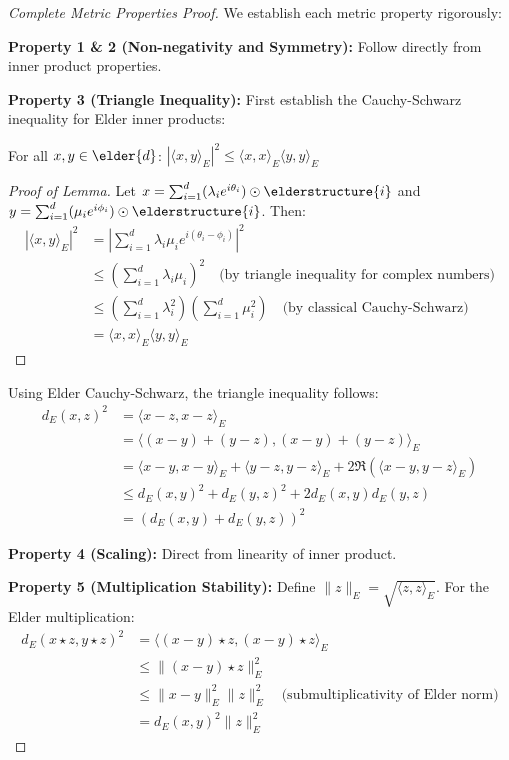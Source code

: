 \begin{proof}[Complete Metric Properties Proof]
We establish each metric property rigorously:

\textbf{Property 1 \& 2 (Non-negativity and Symmetry):} Follow directly from inner product properties.

\textbf{Property 3 (Triangle Inequality):} 
First establish the Cauchy-Schwarz inequality for Elder inner products:

\begin{lemma}
For all $x, y \in \elder{d}$: $|\langle x, y \rangle_E|^2 \leq \langle x, x \rangle_E \langle y, y \rangle_E$
\end{lemma}

\begin{proof}[Proof of Lemma]
Let $x = \sum_{i=1}^{d} (\lambda_i e^{i\theta_i}) \odot \elderstructure{i}$ and $y = \sum_{i=1}^{d} (\mu_i e^{i\phi_i}) \odot \elderstructure{i}$. Then:
\begin{align}
|\langle x, y \rangle_E|^2 &= \left|\sum_{i=1}^d \lambda_i \mu_i e^{i(\theta_i - \phi_i)}\right|^2\\
&\leq \left(\sum_{i=1}^d \lambda_i \mu_i\right)^2 \quad \text{(by triangle inequality for complex numbers)}\\
&\leq \left(\sum_{i=1}^d \lambda_i^2\right)\left(\sum_{i=1}^d \mu_i^2\right) \quad \text{(by classical Cauchy-Schwarz)}\\
&= \langle x, x \rangle_E \langle y, y \rangle_E
\end{align}
\end{proof}

Using Elder Cauchy-Schwarz, the triangle inequality follows:
\begin{align}
d_E(x, z)^2 &= \langle x - z, x - z \rangle_E\\
&= \langle (x - y) + (y - z), (x - y) + (y - z) \rangle_E\\
&= \langle x - y, x - y \rangle_E + \langle y - z, y - z \rangle_E + 2\Re(\langle x - y, y - z \rangle_E)\\
&\leq d_E(x, y)^2 + d_E(y, z)^2 + 2d_E(x, y)d_E(y, z)\\
&= (d_E(x, y) + d_E(y, z))^2
\end{align}

\textbf{Property 4 (Scaling):} Direct from linearity of inner product.

\textbf{Property 5 (Multiplication Stability):} 
Define $\|z\|_E = \sqrt{\langle z, z \rangle_E}$. For the Elder multiplication:
\begin{align}
d_E(x \star z, y \star z)^2 &= \langle (x - y) \star z, (x - y) \star z \rangle_E\\
&\leq \|(x - y) \star z\|_E^2\\
&\leq \|x - y\|_E^2 \|z\|_E^2 \quad \text{(submultiplicativity of Elder norm)}\\
&= d_E(x, y)^2 \|z\|_E^2
\end{align}


\end{proof}
